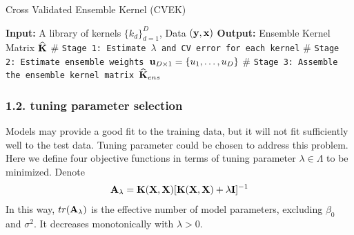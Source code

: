 \documentclass[11pt]{article}
\begin{document}
\begin{algorithm}
\caption{Cross Validated Ensemble Kernel (CVEK)} 
\label{alg:cvke}
\begin{algorithmic}[1]
\newline
\textbf{Input:} A library of kernels $\{k_d\}_{d=1}^D$, Data $({\bf y}, {\bf x})$\newline
\textbf{Output:} Ensemble Kernel Matrix $\widehat{{\bf K}}$\newline
$\#$ \texttt{Stage 1: Estimate $\lambda$ and CV error for each kernel}
\EndFor 
\newline
$\#$ \texttt{Stage 2: Estimate ensemble weights ${\bf u}_{D \times 1} = \{u_1, \dots, u_D\}$}
\newline
$\#$ \texttt{Stage 3: Assemble the ensemble kernel matrix $\widehat{{\bf K}}_{ens}$}
\EndProcedure
\end{algorithmic}
\end{algorithm}

\subsubsection*{{1.2. tuning parameter selection}}
Models may provide a good fit to the training data, but it will not fit sufficiently well to the test data. Tuning parameter could be chosen to address this problem. Here we define four objective functions in terms of tuning parameter $\lambda \in \Lambda$ to be minimized. Denote
\begin{align}
{\bf A}_\lambda={\bf K}({\bf X}, {\bf X})[{\bf K}({\bf X}, {\bf X})+\lambda {\bf I}]^{-1}
\end{align}
In this way, $tr({\bf A}_\lambda)$ is the effective number of model parameters, excluding $\beta_0$ and $\sigma^2$. It decreases monotonically with $\lambda>0$. 
\end{document}
